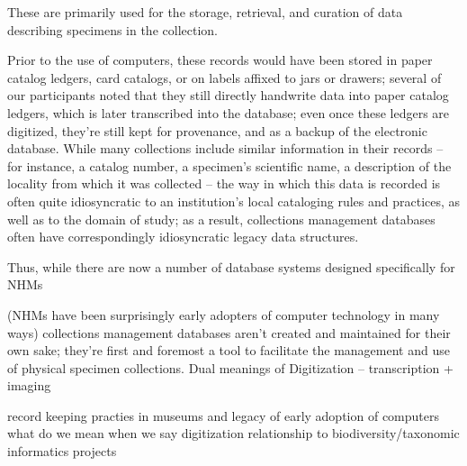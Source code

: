 These are primarily used for the storage, retrieval, and curation of data describing specimens in the collection.

Prior to the use of computers, these records would have been stored in paper catalog ledgers, card catalogs, or on labels affixed to jars or drawers; several of our participants noted that they still directly handwrite data into paper catalog ledgers, which is later transcribed into the database; even once these ledgers are digitized, they’re still kept for provenance, and as a backup of the electronic database. While many collections include similar information in their records – for instance, a catalog number, a specimen’s scientific name, a description of the locality from which it was collected – the way in which this data is recorded is often quite idiosyncratic to an institution’s local cataloging rules and practices, as well as to the domain of study; as a result, collections management databases often have correspondingly idiosyncratic legacy data structures.

Thus, while there are now a number of database systems designed specifically for NHMs

(NHMs have been surprisingly early adopters of computer technology in many ways)
collections management databases aren’t created and maintained for their own sake; they’re first and foremost a tool to facilitate the management and use of physical specimen collections. 
Dual meanings of Digitization – transcription + imaging


record keeping practies in museums and legacy of early adoption of computers
what do we mean when we say digitization
relationship to biodiversity/taxonomic informatics projects

